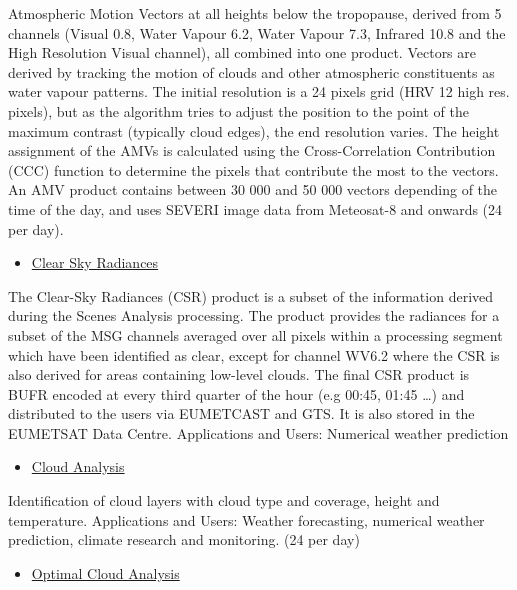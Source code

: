 \documentclass[11pt]{article}
\begin{document}
Atmospheric Motion Vectors at all heights below the tropopause,
derived from 5 channels (Visual 0.8, Water Vapour 6.2, Water
Vapour 7.3, Infrared 10.8 and the High Resolution Visual channel),
all combined into one product. Vectors are derived by tracking the
motion of clouds and other atmospheric constituents as water
vapour patterns. The initial resolution is a 24 pixels grid (HRV
12 high res. pixels), but as the algorithm tries to adjust the
position to the point of the maximum contrast (typically cloud
edges), the end resolution varies. The height assignment of the
AMVs is calculated using the Cross-Correlation Contribution (CCC)
function to determine the pixels that contribute the most to the
vectors. An AMV product contains between 30 000 and 50 000 vectors
depending of the time of the day, and uses SEVERI image data from
Meteosat-8 and onwards (24 per day).

\begin{itemize}
\item \href{http://navigator.eumetsat.int/discovery/Start/DirectSearch/Extended.do?freeTextValue%2528resourceidentifier%2529=EO:EUM:DAT:MSG:CSR}{Clear Sky Radiances}
\end{itemize}

The Clear-Sky Radiances (CSR) product is a subset of the
information derived during the Scenes Analysis processing. The
product provides the radiances for a subset of the MSG channels
averaged over all pixels within a processing segment which have
been identified as clear, except for channel WV6.2 where the CSR
is also derived for areas containing low-level clouds. The final
CSR product is BUFR encoded at every third quarter of the hour
(e.g 00:45, 01:45 \ldots{}) and distributed to the users via EUMETCAST
and GTS. It is also stored in the EUMETSAT Data
Centre. Applications and Users: Numerical weather prediction

\begin{itemize}
\item \href{http://navigator.eumetsat.int/discovery/Start/DirectSearch/Extended.do?freeTextValue%2528resourceidentifier%2529=EO:EUM:DAT:MSG:CLA}{Cloud Analysis}
\end{itemize}

Identification of cloud layers with cloud type and coverage,
height and temperature. Applications and Users: Weather
forecasting, numerical weather prediction, climate research and
monitoring. (24 per day)

\begin{itemize}
\item \href{http://navigator.eumetsat.int/discovery/Start/DirectSearch/Extended.do?freeTextValue%2528resourceidentifier%2529=EO:EUM:DAT:MSG:OCA}{Optimal Cloud Analysis}
\end{itemize}
\end{document}
